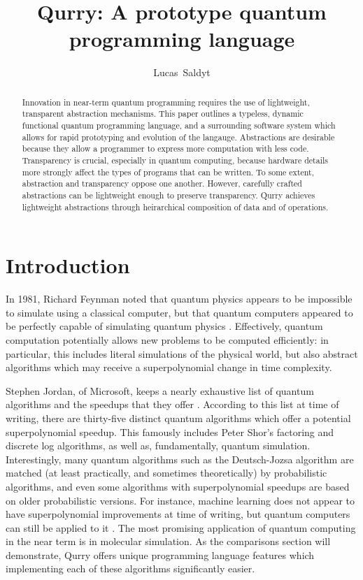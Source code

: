 \documentclass[a4paper,twocolumn,11pt,accepted=2017-05-09]{quantumarticle}
\begin{document}
\title{Qurry: A prototype quantum programming language}

\author{Lucas~Saldyt}
\maketitle

\begin{abstract}
    Innovation in near-term quantum programming requires the use of lightweight, transparent abstraction mechanisms.
    This paper outlines a typeless, dynamic functional quantum programming language, and a surrounding software system which allows for rapid prototyping and evolution of the langauge.
    Abstractions are desirable because they allow a programmer to express more computation with less code.
    Transparency is crucial, especially in quantum computing, because hardware details more strongly affect the types of programs that can be written.
    To some extent, abstraction and transparency oppose one another.
    However, carefully crafted abstractions can be lightweight enough to preserve transparency.
    Qurry achieves lightweight abstractions through heirarchical composition of data and of operations.
\end{abstract}

\section{Introduction}
In 1981, Richard Feynman noted that quantum physics appears to be impossible to simulate using a classical computer, but that quantum computers appeared to be perfectly capable of simulating quantum physics \cite{feynman_1981}.
Effectively, quantum computation potentially allows new problems to be computed efficiently: in particular, this includes literal simulations of the physical world, but also abstract algorithms which may receive a superpolynomial change in time complexity.

Stephen Jordan, of Microsoft, keeps a nearly exhaustive list of quantum algorithms and the speedups that they offer \cite{jordan}.
According to this list at time of writing, there are thirty-five distinct quantum algorithms which offer a potential superpolynomial speedup.
This famously includes Peter Shor's factoring and discrete log algorithms, as well as, fundamentally, quantum simulation.
\cite{shor, small_molecule_sim, feynman_1981, lanyon2010towards, lloyd2006programming}
Interestingly, many quantum algorithms such as the Deutsch-Jozsa algorithm are matched (at least practically, and sometimes theoretically) by probabilistic algorithms, and even some algorithms with superpolynomial speedups are based on older probabilistic versions.  \cite{deutsch1992rapid}
For instance, machine learning does not appear to have superpolynomial improvements at time of writing, but quantum computers can still be applied to it \cite{biamonte2017quantum}.
The most promising application of quantum computing in the near term is in molecular simulation.
As the comparisons section will demonstrate, Qurry offers unique programming language features which implementing each of these algorithms significantly easier.
\end{document}
